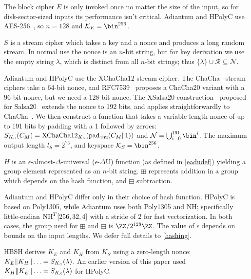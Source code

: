 \documentclass[eprint.tex]{subfiles}
\begin{document}
The block cipher $E$
is only invoked once no matter the size of the input, so for disk-sector-sized inputs
its performance isn't critical. Adiantum and HPolyC use AES-256~\cite{AES}, so $n = 128$ and $\mathcal{K}_E = \bin^{256}$.

$S$
is a stream cipher which takes a key and a nonce and produces a long random stream. In normal use
the nonce is an $n$-bit string, but for key derivation we use the empty string $\lambda$, which
is distinct from all $n$-bit strings; thus $\{\lambda \} \cup \mathcal{R} \subseteq \mathcal{N}$.

Adiantum and HPolyC use the XChaCha12 stream cipher.
The ChaCha~\cite{chacha}
stream ciphers take a 64-bit nonce, and RFC7539~\cite{RFC7539} proposes
a ChaCha20 variant with a 96-bit nonce, but we need a 128-bit nonce.
The XSalsa20 construction~\cite{xsalsa}
proposed for Salsa20~\cite{salsa20,salsa812} extends the nonce to 192 bits, and
applies straightforwardly to ChaCha~\cite{xchacha,monocypher,libsodiumxchacha}.
We then construct a function that takes a variable-length nonce of up to
191 bits by padding with a 1 followed by zeroes:
$S_{K_S}(C_M) = \XChaCha12_{K_S}(\pad_{192}(C_M \Concat 1))$ and
$\mathcal{N} = \bigcup_{i=0}^{191}\bin^i$.
The maximum output length $l_S = 2^{73}$,
and keyspace $\mathcal{K}_S = \bin^{256}$.

$H$
is an $\epsilon$-almost-$\Delta$-universal ($\epsilon$-$\Delta$U) function
(as defined in \autoref{eadudef})
yielding a group element represented as an $n$-bit string.
$\boxplus$ represents addition in a group which depends
on the hash function, and $\boxminus$ subtraction.

\begin{sloppypar}
    Adiantum and HPolyC differ only in their choice of hash function. HPolyC is
    based on Poly1305, while Adiantum uses both Poly1305 and NH;
    specifically little-endian $\operatorname{NH}^T[256, 32, 4]$ with a stride of 2 for fast
    vectorization. In both cases, the group used for $\boxplus$ and $\boxminus$ is
    $\ZZ/2^{128}\ZZ$. The value of $\epsilon$ depends on bounds on the input
    lengths.
    We defer full details to \autoref{hashing}.
\end{sloppypar}

HBSH derives $K_E$ and $K_H$ from $K_S$ using a zero-length nonce:
$K_E \Vert K_H \Vert \ldots = S_{K_S}(\lambda)$. An earlier version of this paper
used $K_H \Vert K_E \Vert \ldots = S_{K_S}(\lambda)$ for HPolyC.

\subbib
\end{document}
